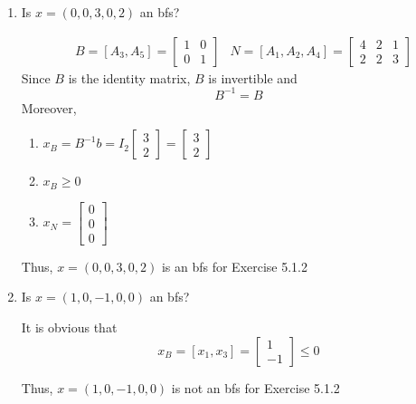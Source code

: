 \documentclass[11pt]{article}
\begin{document}
\begin{enumerate}
    \item Is $x=(0, 0, 3, 0, 2)$ an bfs? \par
    
    \begin{align*}
            & B = [A_3, A_5] = \begin{bmatrix}1 & 0 \\ 0 & 1\end{bmatrix} & N = [A_1, A_2, A_4] = \begin{bmatrix} 4 & 2 & 1 \\ 2 & 2 & 3 \end{bmatrix}
    \end{align*}
    Since $B$ is the identity matrix, $B$ is invertible and $$B^{-1} = B$$
    Moreover, 
    \begin{enumerate}
        \raggedright 
        \item $ x_B = B^{-1}b = I_2 \begin{bmatrix} 3 \\  2\end{bmatrix} = \begin{bmatrix} 3 \\ 2\end{bmatrix}$
        \item $x_B \geq 0$
        \item $x_N = \begin{bmatrix} 0 \\ 0 \\ 0 \end{bmatrix}$
    \end{enumerate}
    Thus, $x=(0, 0, 3, 0, 2)$ is an bfs for Exercise 5.1.2

    \item Is $x=(1, 0, -1, 0, 0)$ an bfs? \par
    It is obvious that $$x_B = [x_1, x_3] = \begin{bmatrix} 1 \\ -1\end{bmatrix} \leq 0$$
    
    Thus, $x=(1, 0, -1, 0, 0)$ is not an bfs for Exercise 5.1.2
    

\end{enumerate}
\end{document}
